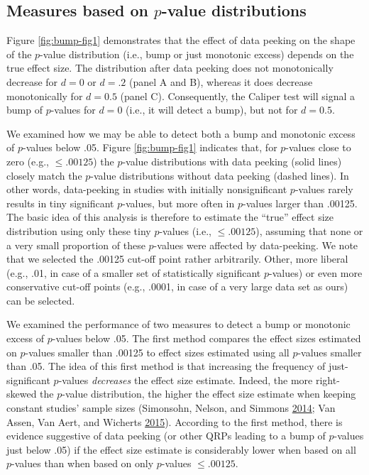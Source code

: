 \documentclass[a5paper]{book}
\begin{document}
\subsection{\texorpdfstring{Measures based on \(p\)-value
distributions}{Measures based on p-value distributions}}\label{measures-based-on-p-value-distributions}

Figure \ref{fig:bump-fig1} demonstrates that the effect of data peeking
on the shape of the \(p\)-value distribution (i.e., bump or just
monotonic excess) depends on the true effect size. The distribution
after data peeking does not monotonically decrease for \(d=0\) or
\(d=.2\) (panel A and B), whereas it does decrease monotonically for
\(d=0.5\) (panel C). Consequently, the Caliper test will signal a bump
of \(p\)-values for \(d=0\) (i.e., it will detect a bump), but not for
\(d=0.5\).

We examined how we may be able to detect both a bump and monotonic
excess of \(p\)-values below .05. Figure \ref{fig:bump-fig1} indicates
that, for \(p\)-values close to zero (e.g., \(\leq.00125\)) the
\(p\)-value distributions with data peeking (solid lines) closely match
the \(p\)-value distributions without data peeking (dashed lines). In
other words, data-peeking in studies with initially nonsignificant
\(p\)-values rarely results in tiny significant \(p\)-values, but more
often in \(p\)-values larger than .00125. The basic idea of this
analysis is therefore to estimate the \enquote{true} effect size
distribution using only these tiny \(p\)-values (i.e., \(\leq.00125\)),
assuming that none or a very small proportion of these \(p\)-values were
affected by data-peeking. We note that we selected the .00125 cut-off
point rather arbitrarily. Other, more liberal (e.g., .01, in case of a
smaller set of statistically significant \(p\)-values) or even more
conservative cut-off points (e.g., .0001, in case of a very large data
set as ours) can be selected.

We examined the performance of two measures to detect a bump or
monotonic excess of \(p\)-values below .05. The first method compares
the effect sizes estimated on \(p\)-values smaller than .00125 to effect
sizes estimated using all \(p\)-values smaller than .05. The idea of
this first method is that increasing the frequency of just-significant
\(p\)-values \emph{decreases} the effect size estimate. Indeed, the more
right-skewed the \(p\)-value distribution, the higher the effect size
estimate when keeping constant studies' sample sizes (Simonsohn, Nelson,
and Simmons \protect\hyperlink{ref-doi:10.1037ux2fa0033242}{2014}; Van
Assen, Van Aert, and Wicherts
\protect\hyperlink{ref-doi:10.1037ux2fmet0000025}{2015}). According to
the first method, there is evidence suggestive of data peeking (or other
QRPs leading to a bump of \(p\)-values just below .05) if the effect
size estimate is considerably lower when based on all \(p\)-values than
when based on only \(p\)-values \(\leq.00125\).
\end{document}
